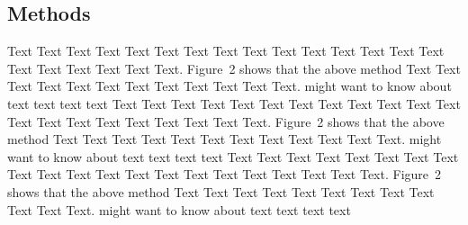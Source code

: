 \documentclass{bioinfo}
\begin{document}
\begin{table}[!t]
\end{table}

\begin{methods}
\section{Methods}

Text Text Text Text Text Text  Text Text Text Text Text Text Text
Text Text  Text Text Text Text Text Text.
Figure~2\vphantom{\ref{fig:02}} shows that the above method  Text
Text Text Text  Text Text Text Text Text Text  Text Text.
\citealp{Boffelli03} might want to know about  text text text text
Text Text Text Text Text Text Text Text Text Text Text Text Text
Text Text  Text Text Text Text Text Text.
Figure~2\vphantom{\ref{fig:02}} shows that the above method  Text
Text Text Text Text Text Text Text Text Text  Text Text.
\citealp{Boffelli03} might want to know about text text text text
Text Text Text Text Text Text  Text Text Text Text Text Text Text
Text Text Text Text Text Text Text Text.
Figure~2\vphantom{\ref{fig:02}} shows that the above method  Text
Text Text Text Text Text Text Text Text Text  Text Text.
\citealp{Boffelli03} might want to know about text text text
text\vspace*{1pt}

\end{methods}
\end{document}
